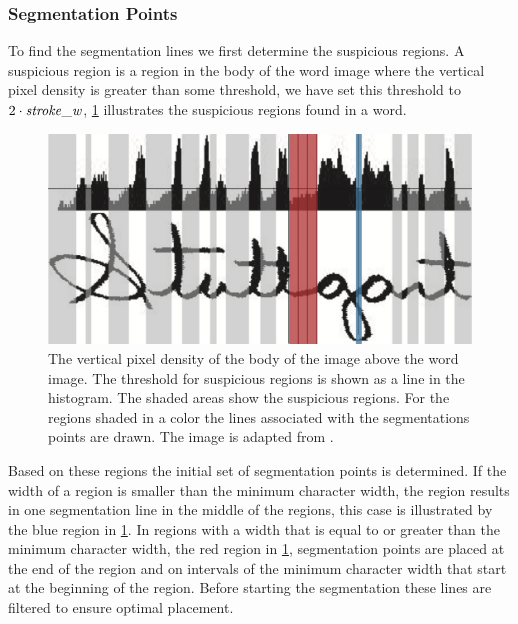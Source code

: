 \subsubsection{Segmentation Points}
\label{sss:method:segmentaton:segmentationpoints}
	To find the segmentation lines we first determine the suspicious regions. A suspicious region is a region in the body of the word image where the vertical pixel density is greater than some threshold, we have set this threshold to $2 \cdot \mathit{stroke\_w}$, \cref{fig:method:segmentation:suspiciousRegions} illustrates the suspicious regions found in a word. 

	\begin{figure}
		\centering
		\includegraphics[width=\columnwidth]{shared/img/method/suspicious_regions.png}
		\caption{The vertical pixel density of the body of the image above the word image.  The threshold for suspicious regions is shown as a line in the histogram. The shaded areas show the suspicious regions. For the regions shaded in a color the lines associated with the segmentations points are drawn. The image is adapted from \cite{lee2012binary}.}
		\label{fig:method:segmentation:suspiciousRegions}
	\end{figure}

	Based on these regions the initial set of segmentation points is determined. If the width of a region is smaller than the minimum character width, the region results in one segmentation line in the middle of the regions, this case is illustrated by the blue region in \cref{fig:method:segmentation:suspiciousRegions}. In regions with a width that is equal to or greater than the minimum character width, the red region in \cref{fig:method:segmentation:suspiciousRegions}, segmentation points are placed at the end of the region and on intervals of the minimum character width that start at the beginning of the region. Before starting the segmentation these lines are filtered to ensure optimal placement. 

